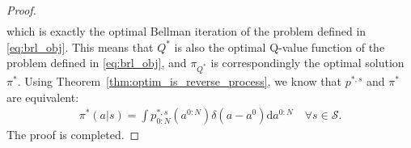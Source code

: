 \begin{proof}
\begin{equation}
\begin{aligned}
    \end{aligned}
    \end{equation}
    which is exactly the optimal Bellman iteration of the problem defined in \eqref{eq:brl_obj}. This means that $Q^*$ is also the optimal Q-value function of the problem defined in \eqref{eq:brl_obj}, and $\pi_{Q^*}$ is correspondingly the optimal solution $\pi^*$. Using Theorem~\ref{thm:optim_is_reverse_process}, we know that $p^{*,s}$ and $\pi^*$ are equivalent:
    \begin{equation}
        \begin{aligned}
            \pi^*(a|s)=\int p^{*, s}_{0:N}(a^{0:N})\delta(a-a^0)\mathrm{d} a^{0:N}\quad \forall s\in \mathcal{S}. 
        \end{aligned}
    \end{equation}
    The proof is completed. 
\end{proof}  




